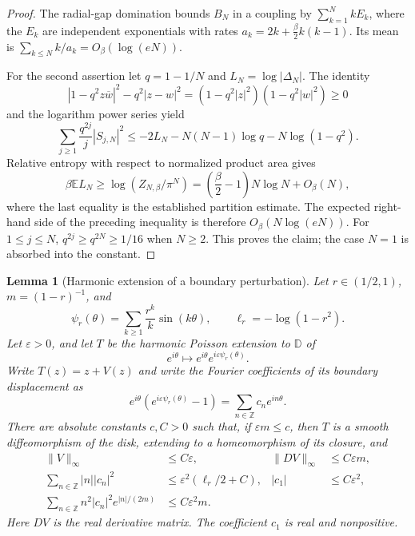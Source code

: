\documentclass[11pt,a4paper]{article}
\numberwithin{equation}{section}
\newtheorem{lemma}[theorem]{Lemma}
\theoremstyle{definition}
\theoremstyle{remark}
\begin{document}
\begin{proof}
The radial-gap domination bounds $B_N$ in a coupling by
$\sum_{k=1}^N kE_k$, where the $E_k$ are independent exponentials with
rates $a_k=2k+\frac\beta2k(k-1)$. Its mean is
$\sum_{k\leq N}k/a_k=O_\beta(\log(eN))$.

For the second assertion let $q=1-1/N$ and $L_N=\log|\Delta_N|$.
The identity
\[
 |1-q^2z\overline w|^2-q^2|z-w|^2
 =(1-q^2|z|^2)(1-q^2|w|^2)\geq0
\]
and the logarithm power series yield
\[
 \sum_{j\geq1}\frac{q^{2j}}j|S_{j,N}|^2
 \leq-2L_N-N(N-1)\log q-N\log(1-q^2).
\]
Relative entropy with respect to normalized product area gives
\[
 \beta\mathbb E L_N\geq
 \log(Z_{N,\beta}/\pi^N)
 =\left(\frac\beta2-1\right)N\log N+O_\beta(N),
\]
where the last equality is the established partition estimate.
The expected right-hand side of the preceding inequality is therefore
$O_\beta(N\log(eN))$. For $1\leq j\leq N$,
$q^{2j}\geq q^{2N}\geq1/16$ when $N\geq2$.
This proves the claim; the case $N=1$ is absorbed into the constant.
\end{proof}

\begin{lemma}[Harmonic extension of a boundary perturbation]
\label{lem:harmonic-boundary-map}
Let $r\in(1/2,1)$, $m=(1-r)^{-1}$, and
\[
 \psi_r(\theta)=\sum_{k\geq1}\frac{r^k}{k}\sin(k\theta),
 \qquad \ell_r=-\log(1-r^2).
\]
Let $\varepsilon>0$, and let $T$ be the harmonic Poisson extension to
$\mathbb D$ of
\[
 e^{i\theta}\longmapsto e^{i\theta}e^{i\varepsilon\psi_r(\theta)}.
\]
Write $T(z)=z+V(z)$ and write the Fourier coefficients of its boundary
displacement as
\[
 e^{i\theta}(e^{i\varepsilon\psi_r(\theta)}-1)
 =\sum_{n\in\mathbb Z}c_ne^{in\theta}.
\]
There are absolute constants $c,C>0$ such that, if
$\varepsilon m\leq c$, then $T$ is a smooth diffeomorphism of the disk,
extending to a homeomorphism of its closure, and
\begin{align}
 \|V\|_\infty&\leq C\varepsilon,
 &\|DV\|_\infty&\leq C\varepsilon m,
 \label{eq:harmonic-map-uniform-bounds}\\
 \sum_{n\in\mathbb Z}|n||c_n|^2
 &\leq\varepsilon^2(\ell_r/2+C),
 &|c_1|&\leq C\varepsilon^2,
 \label{eq:harmonic-map-half-derivative}\\
 \sum_{n\in\mathbb Z}n^2|c_n|^2e^{|n|/(2m)}
 &\leq C\varepsilon^2m.
 \label{eq:harmonic-map-strip-bound}
\end{align}
Here $DV$ is the real derivative matrix. The coefficient $c_1$ is real
and nonpositive.
\end{lemma}
\end{document}
